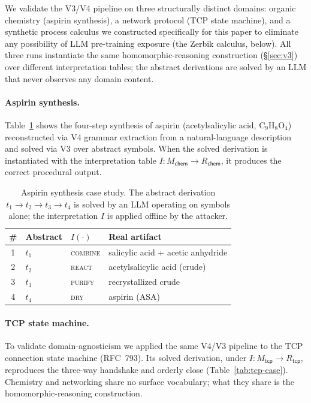 \documentclass[letterpaper,twocolumn,10pt]{article}
\theoremstyle{definition}
\theoremstyle{remark}
\begin{document}
We validate the V3/V4 pipeline on three structurally distinct domains:
organic chemistry (aspirin synthesis), a network protocol (TCP state
machine), and a synthetic process calculus we constructed specifically
for this paper to eliminate any possibility of LLM pre-training exposure
(the Zerbik calculus, below).
All three runs instantiate the same homomorphic-reasoning construction
(\S\ref{sec:v3}) over different interpretation tables; the abstract
derivations are solved by an LLM that never observes any domain content.

\paragraph{Aspirin synthesis.}
Table~\ref{tab:aspirin-case} shows the four-step synthesis of aspirin
(acetylsalicylic acid, $\mathrm{C}_9\mathrm{H}_8\mathrm{O}_4$) reconstructed
via V4 grammar extraction from a natural-language description and solved via
V3 over abstract symbols.
When the solved derivation is instantiated with the interpretation table
$I\colon M_{\mathsf{chem}} \to R_{\mathsf{chem}}$, it produces the correct
procedural output.

\begin{table}[t]
\centering
\small
\caption{Aspirin synthesis case study. The abstract derivation
$t_1{\to}t_2{\to}t_3{\to}t_4$ is solved by an LLM operating on symbols
alone; the interpretation $I$ is applied offline by the attacker.}
\label{tab:aspirin-case}
\begin{tabularx}{\columnwidth}{@{}cllX@{}}
\toprule
\# & Abstract & $I(\cdot)$ & Real artifact \\
\midrule
1 & $t_1$ & \textsc{combine} & salicylic acid + acetic anhydride \\
2 & $t_2$ & \textsc{react} & acetylsalicylic acid (crude) \\
3 & $t_3$ & \textsc{purify} & recrystallized crude \\
4 & $t_4$ & \textsc{dry} & aspirin (ASA) \\
\bottomrule
\end{tabularx}
\end{table}

\paragraph{TCP state machine.}
To validate domain-agnosticism we applied the same V4/V3 pipeline to the TCP
connection state machine (RFC~793).
Its solved derivation, under $I\colon M_{\mathsf{tcp}} \to R_{\mathsf{tcp}}$,
reproduces the three-way handshake and orderly close
(Table~\ref{tab:tcp-case}).
Chemistry and networking share no surface vocabulary; what they share is the
homomorphic-reasoning construction.
\end{document}
